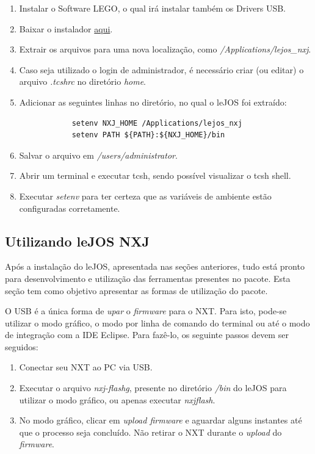 	\begin{enumerate}
		\item Instalar o Software LEGO, o qual irá instalar também os Drivers USB.
		\item Baixar o instalador \href{www.lejos.org}{aqui}.
		\item Extrair os arquivos para uma nova localização, como \textit{/Applications/lejos\_nxj}.
		\item Caso seja utilizado o login de administrador, é necessário criar (ou editar) o arquivo \textit{.tcshrc} no diretório \textit{home}.
		\item Adicionar as seguintes linhas no diretório, no qual o leJOS foi extraído:
		\begin{lstlisting}
			setenv NXJ_HOME /Applications/lejos_nxj
			setenv PATH ${PATH}:${NXJ_HOME}/bin
		\end{lstlisting}
		\item Salvar o arquivo em \textit{/users/administrator}.
		\item Abrir um terminal e executar tcsh, sendo possível visualizar o tcsh shell.
		\item Executar \textit{setenv} para ter certeza que as variáveis de ambiente estão configuradas corretamente.
	\end{enumerate}

\subsection{Utilizando leJOS NXJ} %
\label{sub:utilizando_lejos_nxj}

	Após a instalação do leJOS, apresentada nas seções anteriores, tudo está pronto para desenvolvimento e utilização das ferramentas presentes no pacote. Esta seção tem como objetivo apresentar as formas de utilização do pacote.

	O USB é a única forma de \textit{upar} o \textit{firmware} para o NXT. Para isto, pode-se utilizar o modo gráfico, o modo por linha
	de comando do terminal ou até o modo de integração com a IDE Eclipse. Para fazê-lo, os seguinte passos devem ser seguidos:

	\begin{enumerate}
		\item Conectar seu NXT ao PC via USB.
		\item Executar o arquivo \textit{nxj-flashg}, presente no diretório \textit{/bin} do leJOS para utilizar o modo gráfico, ou apenas executar \textit{nxjflash}.
		\item No modo gráfico, clicar em \textit{upload firmware} e aguardar alguns instantes até que o processo seja concluído. Não retirar o NXT durante o \textit{upload} do \textit{firmware}.
	\end{enumerate}

